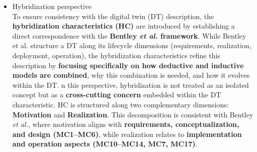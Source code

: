 \documentclass[
]{article}
\providecommand{\tightlist}{%
  \setlength{\itemsep}{0pt}\setlength{\parskip}{0pt}}
\begin{document}
\begin{itemize}
\begin{itemize}
\begin{itemize}
\begin{itemize}
        \begin{itemize}
        \tightlist
        \item
          \textbf{Cavitation detection:}\\
          The DT evaluates operating conditions to detect cavitation
          risks within the hydraulic system using the simulation model.
        \item
          \textbf{Virtual sensing:}\\
          In case of sensor failure (e.g., flow rate sensor), the DT
          estimates missing variables using the simulation model,
          ensuring continuity of monitoring.
        \item
          \textbf{Energy consumption analysis:}\\
          The DT simulates different cooling strategies (e.g., fast,
          medium, slow cooling scenarios) and evaluates their energy
          impact, enabling informed operational decisions.
        \item
          \textbf{Divergence detection:}\\
          The DT continuously compares simulated outputs with real
          measurements to identify discrepancies. When divergence is
          detected, it triggers recalibration or parameter update
          processes.\\
        \end{itemize}
      \end{itemize}
    \end{itemize}
  \item
    Hybridization perspective\\
    To ensure consistency with the digital twin (DT) description, the
    \textbf{hybridization characteristics (HC)} are introduced by
    establishing a direct correspondence with the \textbf{Bentley
    \emph{et al.} framework}. While Bentley et al. structure a DT along
    its lifecycle dimensions (requirements, realization, deployment,
    operation), the hybridization characteristics refine this
    description by \textbf{focusing specifically on how deductive and
    inductive models are combined}, why this combination is needed, and
    how it evolves within the DT. n this perspective, hybridization is
    not treated as an isolated concept but as a \textbf{cross-cutting
    concern} embedded within the DT characteristic. HC is structured
    along two complementary dimensions: \textbf{Motivation} and
    \textbf{Realization}. This decomposition is consistent with Bentley
    \emph{et al.}, where motivation aligns with \textbf{requirements,
    conceptualization, and design (MC1--MC6)}, while realization relates
    to \textbf{implementation and operation aspects (MC10--MC14, MC7,
    MC17)}.


\end{itemize}
\end{itemize}
\end{document}
